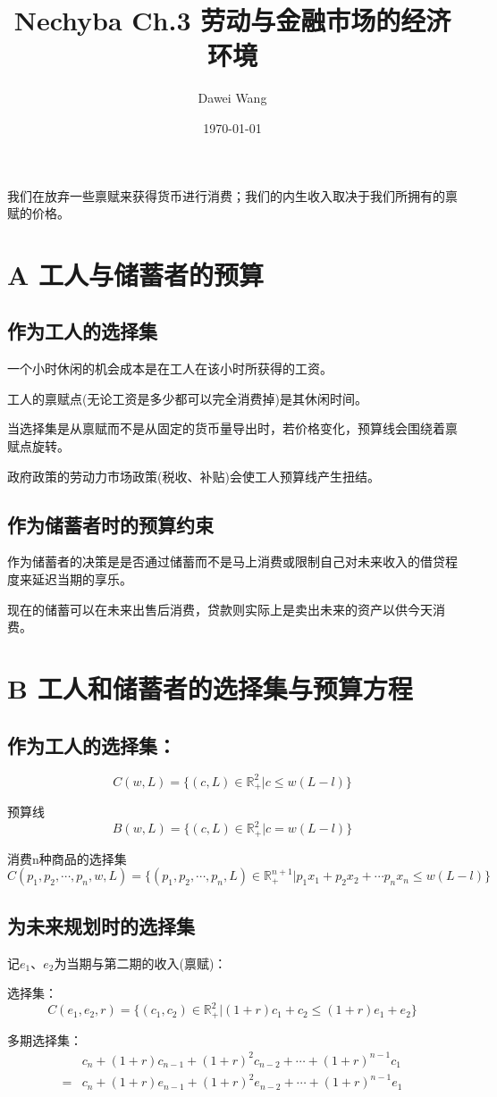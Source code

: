 \documentclass{article}
\title{Nechyba Ch.3 劳动与金融市场的经济环境}
\author{Dawei Wang}
\date{\today}
\begin{document}
	\maketitle
我们在放弃一些禀赋来获得货币进行消费；我们的内生收入取决于我们所拥有的禀赋的价格。
\section{A 工人与储蓄者的预算}
\subsection{作为工人的选择集}
一个小时休闲的机会成本是在工人在该小时所获得的工资。

\hspace*{\fill}

工人的禀赋点(无论工资是多少都可以完全消费掉)是其休闲时间。

\hspace*{\fill}

当选择集是从禀赋而不是从固定的货币量导出时，若价格变化，预算线会围绕着禀赋点旋转。

\hspace*{\fill}

政府政策的劳动力市场政策(税收、补贴)会使工人预算线产生扭结。

\subsection{作为储蓄者时的预算约束}
作为储蓄者的决策是是否通过储蓄而不是马上消费或限制自己对未来收入的借贷程度来延迟当期的享乐。

现在的储蓄可以在未来出售后消费，贷款则实际上是卖出未来的资产以供今天消费。

\section{B 工人和储蓄者的选择集与预算方程}
\subsection{作为工人的选择集：}
\[
C(w,L)=\{(c,L)\in\mathbb{R}^2_+|c\le w(L-l)\}
\]

预算线
\[
B(w,L)=\{(c,L)\in\mathbb{R}^2_+|c= w(L-l)\}
\]

消费n种商品的选择集
\[
C(p_1,p_2,\cdots,p_n,w,L)=\{(p_1,p_2,\cdots,p_n,L)\in\mathbb{R}^{n+1}_+|p_1x_1+p_2x_2+\cdots p_nx_n\le w(L-l)\}
\]

\subsection{为未来规划时的选择集}
记$ e_1 $、$ e_2 $为当期与第二期的收入(禀赋)：

选择集：
\[
C(e_1,e_2,r)=\{(c_1,c_2)\in\mathbb{R}^2_+|(1+r)c_1+c_2\le(1+r)e_1+e_2\}
\]

多期选择集：
\begin{equation*}
	\begin{split}
	&c_n+(1+r)c_{n-1}+(1+r)^2c_{n-2}+\cdots+(1+r)^{n-1}c_1\\
	=&c_n+(1+r)e_{n-1}+(1+r)^2e_{n-2}+\cdots+(1+r)^{n-1}e_1
	\end{split}
\end{equation*}
\end{document}
